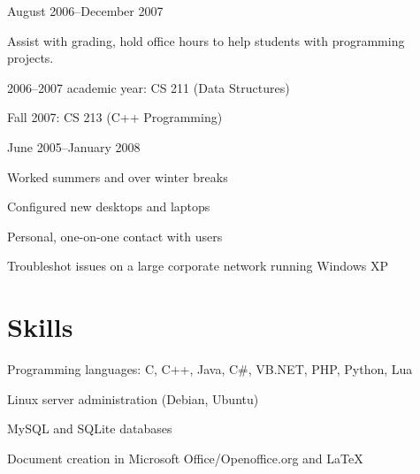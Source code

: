 \documentclass[11pt]{resume}
\begin{document}
	{August 2006--December 2007}
	\begin{compactitem}
	\item Assist with grading, hold office hours to help students with programming
	projects.
	\item 2006--2007 academic year: CS 211 (Data Structures)
	\item Fall 2007: CS 213 (C++ Programming)
	\end{compactitem}

	{June 2005--January 2008}
	\begin{compactitem}
	\item Worked summers and over winter breaks
	\item Configured new desktops and laptops
	\item Personal, one-on-one contact with users
	\item Troubleshot issues on a large corporate network running Windows XP
	\end{compactitem}

\section{Skills}
	\vspace{\secskip}
	\begin{compactitem}
	\item Programming languages: C, C++, Java, C\#, VB.NET, PHP, Python, Lua
	\item Linux server administration (Debian, Ubuntu)
	\item MySQL and SQLite databases
	\item Document creation in Microsoft Office/Openoffice.org and \LaTeX{}
	\end{compactitem}
\end{document}

